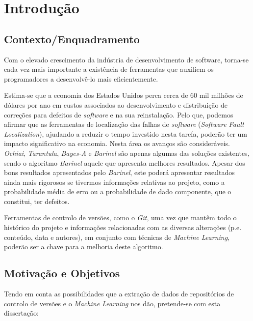 \chapter{Introdução} \label{chap:intro}

\section*{}


\section{Contexto/Enquadramento} \label{sec:context}

Com o elevado crescimento da indústria de desenvolvimento de software,
torna-se cada vez mais importante a existência de ferramentas que auxiliem
os programadores a desenvolvê-lo mais eficientemente.

Estima-se que a economia dos Estados Unidos perca cerca de 60 mil milhões de dólares por ano em custos associados ao desenvolvimento e distribuição de correções para defeitos de \emph{software} e na sua reinstalação. Pelo que, podemos afirmar que as ferramentas de localização das falhas de \emph{software} (\emph{Software Fault Localization}), ajudando a reduzir o tempo investido nesta tarefa, poderão ter um impacto significativo na economia. %
Nesta área os avanços são consideráveis. \emph{Ochiai}, \emph{Tarantula}, \emph{Bayes-A} e \emph{Barinel} são apenas algumas das soluções existentes, sendo o algoritmo \emph{Barinel} aquele que apresenta melhores resultados. %
Apesar dos bons resultados apresentados pelo \emph{Barinel}, este poderá apresentar resultados ainda mais rigorosos se tivermos informações relativas ao projeto, como a probabilidade média de erro ou a probabilidade de dado componente, que o constitui, ter defeitos.

Ferramentas de controlo de versões, como o \emph{Git}, uma vez que mantêm todo o histórico do projeto e informações relacionadas com as diversas alterações (p.e. conteúdo, data e autores), em conjunto com técnicas de \emph{Machine Learning}, poderão ser a chave para a melhoria deste algoritmo.

\section{Motivação e Objetivos} \label{sec:goals}

Tendo em conta as possibilidades que a extração de dados de repositórios de controlo de versões e o \emph{Machine Learning} nos dão, pretende-se com esta dissertação:

